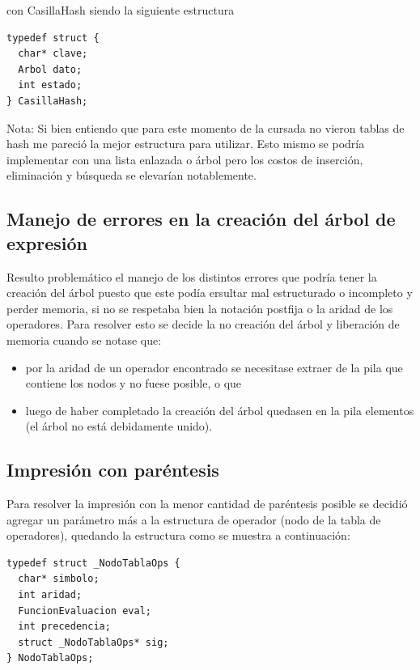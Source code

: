 \documentclass[11pt]{article}
\begin{document}
con CasillaHash siendo la siguiente estructura 

\begin{lstlisting}[style = CStyle]
typedef struct {
  char* clave;
  Arbol dato;
  int estado;
} CasillaHash;
\end{lstlisting}

Nota: Si bien entiendo que para este momento de la cursada no vieron tablas de hash me pareci\'o la mejor estructura para utilizar. Esto mismo se podría implementar con una lista enlazada o \'arbol pero los costos de inserci\'on, eliminaci\'on y b\'usqueda se elevar\'ian notablemente. 

\subsection{Manejo de errores en la creaci\'on del \'arbol de expresi\'on}
Resulto problem\'atico el manejo de los distintos errores que podr\'ia tener la creaci\'on del \'arbol puesto que este pod\'ia ersultar mal estructurado o incompleto y perder memoria, si no se respetaba bien la notaci\'on postfija o la aridad de los operadores. Para resolver esto se decide la no creaci\'on del \'arbol y liberaci\'on de memoria cuando se notase que: 

\begin{itemize}
    \item por la aridad de un operador encontrado se necesitase extraer de la pila que contiene los nodos y no fuese posible, o que
    \item luego de haber completado la creaci\'on del \'arbol quedasen en la pila elementos (el \'arbol no est\'a debidamente unido).
\end{itemize}

\subsection{Impresi\'on con par\'entesis}
Para resolver la impresi\'on con la menor cantidad de par\'entesis posible se decidi\'o agregar un par\'ametro m\'as a la estructura de operador (nodo de la tabla de operadores), quedando la estructura como se muestra a continuaci\'on: 

\begin{lstlisting}[style = CStyle]
typedef struct _NodoTablaOps {
  char* simbolo;
  int aridad;
  FuncionEvaluacion eval;
  int precedencia;
  struct _NodoTablaOps* sig;
} NodoTablaOps;
\end{lstlisting}
\end{document}
